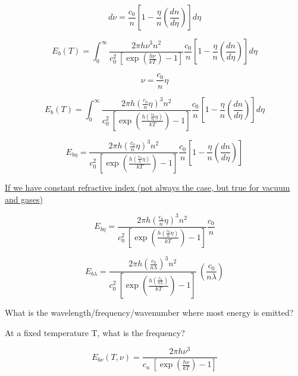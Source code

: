 \documentclass[12pt]{article}
\renewcommand{\_}{\kern-1.5pt\textunderscore\kern-1.5pt}
\begin{document}
\begin{itemize}
 \[ d \nu =\frac{c_{0}}{n} \left[ 1-\frac{ \eta }{n} \left( \frac{dn}{d \eta } \right)  \right] d \eta  \] \par


\vspace{\baselineskip}
 \[ E_{b} \left( T \right) =  \int _{0}^{\infty}\frac{2 \pi h \nu ^{3}n^{2}}{c_{0}^{2}~ \left[ \exp  \left( \frac{h \nu }{kT} \right) -1 \right] }\frac{c_{0}}{n} \left[ 1-\frac{ \eta }{n} \left( \frac{dn}{d \eta } \right)  \right] d \eta  \] \par

 \[  \nu =\frac{c_{0}}{n} \eta  \] \par

 \[ E_{b} \left( T \right) =  \int _{0}^{\infty}\frac{2 \pi h \left( \frac{c_{0}}{n} \eta  \right) ^{3}n^{2}}{c_{0}^{2}~ \left[ \exp  \left( \frac{h \left( \frac{c_{0}}{n} \eta  \right) }{kT} \right) -1 \right] }\frac{c_{0}}{n} \left[ 1-\frac{ \eta }{n} \left( \frac{dn}{d \eta } \right)  \right] d \eta  \] \par

 \[ E_{b \eta }=\frac{2 \pi h \left( \frac{c_{0}}{n} \eta  \right) ^{3}n^{2}}{c_{0}^{2}~ \left[ \exp  \left( \frac{h \left( \frac{c_{0}}{n} \eta  \right) }{kT} \right) -1 \right] }\frac{c_{0}}{n} \left[ 1-\frac{ \eta }{n} \left( \frac{dn}{d \eta } \right)  \right]  \] \par

\uline{If we have constant refractive index (not always the case, but true for vacuum and gases)}\par

 \[ E_{b \eta }=\frac{2 \pi h \left( \frac{c_{0}}{n} \eta  \right) ^{3}n^{2}}{c_{0}^{2}~ \left[ \exp  \left( \frac{h \left( \frac{c_{0}}{n} \eta  \right) }{kT} \right) -1 \right] }\frac{c_{0}}{n} \] \par

 \[ E_{b \lambda }=\frac{2 \pi h \left( \frac{c_{0}}{n \lambda } \right) ^{3}n^{2}}{c_{0}^{2}~ \left[ \exp  \left( \frac{h \left( \frac{c_{0}}{n \lambda } \right) }{kT} \right) -1 \right] }~ \left( \frac{c_{0}}{n \lambda } \right)  \] \par

What is the wavelength/frequency/wavenumber where most energy is emitted?\par

At a fixed temperature T, what is the frequency?\par

 \[ E_{b \nu } \left( T, \nu  \right) =\frac{2 \pi h \nu ^{3}}{c_{n}~ \left[ \exp  \left( \frac{h \nu }{kT} \right) -1 \right] } \] \par


\end{itemize}
\end{document}
